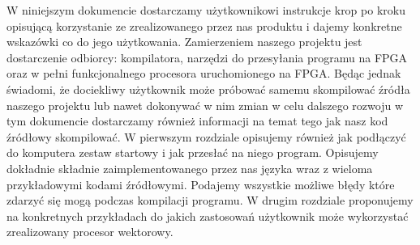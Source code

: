 W niniejszym dokumencie dostarczamy użytkownikowi instrukcje krop po kroku opisującą korzystanie ze zrealizowanego przez nas produktu i dajemy konkretne wskazówki co do jego użytkowania. Zamierzeniem naszego projektu jest dostarczenie odbiorcy: kompilatora, narzędzi do przesyłania programu na FPGA oraz w pełni funkcjonalnego procesora uruchomionego na FPGA. Będąc jednak świadomi, że dociekliwy użytkownik może próbować samemu skompilować źródła naszego projektu lub nawet dokonywać w nim zmian w celu dalszego rozwoju w tym dokumencie dostarczamy również informacji na temat tego jak nasz kod źródłowy skompilować. W pierwszym rozdziale opisujemy również jak podłączyć do komputera zestaw startowy i jak przesłać na niego program. Opisujemy dokładnie składnie zaimplementowanego przez nas języka wraz z wieloma przykładowymi kodami źródłowymi. Podajemy wszystkie możliwe błędy które zdarzyć się mogą podczas kompilacji programu. W drugim rozdziale proponujemy na konkretnych przykładach do jakich zastosowań użytkownik może wykorzystać zrealizowany procesor wektorowy.